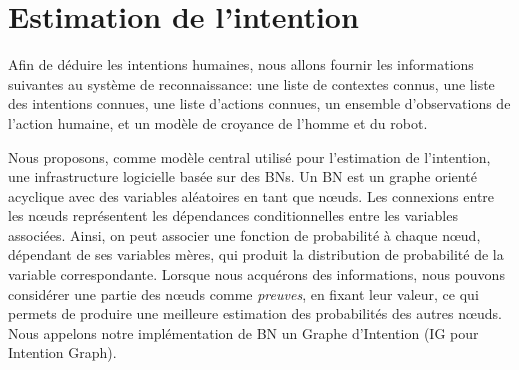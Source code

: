 \documentclass[a4paper,11pt,twoside]{StyleThese}
\begin{document}


\section{Estimation de l'intention}

Afin de déduire les intentions humaines, nous allons fournir les informations suivantes au système de reconnaissance: une liste de contextes connus, une liste des intentions connues, une liste d'actions connues, un ensemble d'observations de l'action humaine, et un modèle de croyance de l'homme et du robot.

Nous proposons, comme modèle central utilisé pour l'estimation de l'intention, une infrastructure logicielle basée sur des BNs. Un BN est un graphe orienté acyclique avec des variables aléatoires en tant que nœuds. Les connexions entre les nœuds représentent les dépendances conditionnelles entre les variables associées. Ainsi, on peut associer une fonction de probabilité à chaque nœud, dépendant de ses variables mères, qui produit la distribution de probabilité de la variable correspondante. Lorsque nous acquérons des informations, nous pouvons considérer une partie des nœuds comme \textit{preuves}, en fixant leur valeur, ce qui permets de produire une meilleure estimation des probabilités des autres nœuds. Nous appelons notre implémentation de BN un Graphe d'Intention (IG pour Intention Graph).

\end{document}
